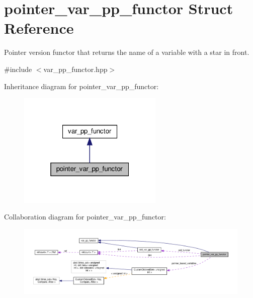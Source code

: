 \hypertarget{structpointer__var__pp__functor}{}\section{pointer\+\_\+var\+\_\+pp\+\_\+functor Struct Reference}
\label{structpointer__var__pp__functor}


Pointer version functor that returns the name of a variable with a star in front.  




{\ttfamily \#include $<$var\+\_\+pp\+\_\+functor.\+hpp$>$}



Inheritance diagram for pointer\+\_\+var\+\_\+pp\+\_\+functor\+:
\nopagebreak
\begin{figure}[H]
\begin{center}
\leavevmode
\includegraphics[width=196pt]{d6/d40/structpointer__var__pp__functor__inherit__graph}
\end{center}
\end{figure}


Collaboration diagram for pointer\+\_\+var\+\_\+pp\+\_\+functor\+:
\nopagebreak
\begin{figure}[H]
\begin{center}
\leavevmode
\includegraphics[width=350pt]{de/d83/structpointer__var__pp__functor__coll__graph}
\end{center}
\end{figure}
